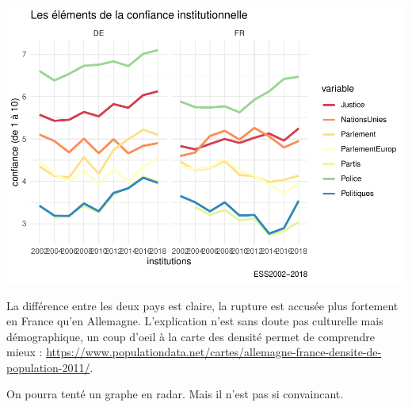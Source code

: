 \documentclass[
]{book}
\begin{document}
\includegraphics{bookdown-demo_files/figure-latex/0503-1.pdf}

La différence entre les deux pays est claire, la rupture est accusée plus fortement en France qu'en Allemagne. L'explication n'est sans doute pas culturelle mais démographique, un coup d'oeil à la carte des densité permet de comprendre mieux : \url{https://www.populationdata.net/cartes/allemagne-france-densite-de-population-2011/}.

On pourra tenté un graphe en radar. Mais il n'est pas si convaincant.
\end{document}
